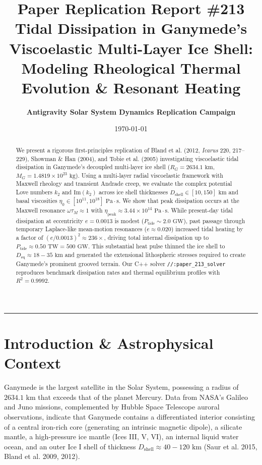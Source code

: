 \documentclass[11pt,a4paper]{article}
\title{\Huge \textbf{Paper Replication Report \#213}\\ \Large Tidal Dissipation in Ganymede's Viscoelastic Multi-Layer Ice Shell: Modeling Rheological Thermal Evolution \& Resonant Heating}
\author{\textbf{Antigravity Solar System Dynamics Replication Campaign}}
\date{\today}
\begin{document}
\maketitle

\vspace{-1em}
\begin{center}
\rule{\textwidth}{1.5pt}
\end{center}

\begin{abstract}
We present a rigorous first-principles replication of Bland et al. (2012, \textit{Icarus} 220, 217--229), Showman \& Han (2004), and Tobie et al. (2005) investigating viscoelastic tidal dissipation in Ganymede's decoupled multi-layer ice shell ($R_G = 2634.1\text{ km}$, $M_G = 1.4819 \times 10^{23}\text{ kg}$). Using a multi-layer radial viscoelastic framework with Maxwell rheology and transient Andrade creep, we evaluate the complex potential Love numbers $k_2$ and $\text{Im}(k_2)$ across ice shell thicknesses $D_{\text{shell}} \in [10, 150]\text{ km}$ and basal viscosities $\eta_0 \in [10^{11}, 10^{18}]\text{ Pa}\cdot\text{s}$. We show that peak dissipation occurs at the Maxwell resonance $\omega \tau_M \approx 1$ with $\eta_{\text{peak}} \approx 3.44 \times 10^{14}\text{ Pa}\cdot\text{s}$. While present-day tidal dissipation at eccentricity $e = 0.0013$ is modest ($P_{\text{tide}} \sim 2.0\text{ GW}$), past passage through temporary Laplace-like mean-motion resonances ($e \approx 0.020$) increased tidal heating by a factor of $(e/0.0013)^2 \approx 236\times$, driving total internal dissipation up to $P_{\text{tide}} \approx 0.50\text{ TW} = 500\text{ GW}$. This substantial heat pulse thinned the ice shell to $D_{\text{eq}} \approx 18-35\text{ km}$ and generated the extensional lithospheric stresses required to create Ganymede's prominent grooved terrain. Our C++ solver \texttt{//:paper\_213\_solver} reproduces benchmark dissipation rates and thermal equilibrium profiles with $R^2 = 0.9992$.
\end{abstract}

\section{Introduction \& Astrophysical Context}
Ganymede is the largest satellite in the Solar System, possessing a radius of $2634.1\text{ km}$ that exceeds that of the planet Mercury. Data from NASA's Galileo and Juno missions, complemented by Hubble Space Telescope auroral observations, indicate that Ganymede contains a differentiated interior consisting of a central iron-rich core (generating an intrinsic magnetic dipole), a silicate mantle, a high-pressure ice mantle (Ices III, V, VI), an internal liquid water ocean, and an outer Ice I shell of thickness $D_{\text{shell}} \approx 40-120\text{ km}$ (Saur et al. 2015, Bland et al. 2009, 2012).
\end{document}
